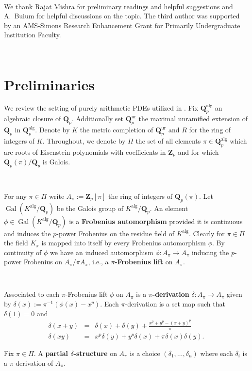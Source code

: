 \documentclass[10pt]{amsart}
\theoremstyle{Theorem}
\theoremstyle{definition}
\newcommand{\ZZ}{\mathbf Z}
\newcommand{\QQ}{\mathbf Q}
\renewcommand{\d}{\delta}
\def\ur{\textrm{ur}}
\def\alg{\textrm{alg}}
\def\Gal{\operatorname{Gal}}
\begin{document}
\

 We thank Rajat Mishra for preliminary readings and helpful suggestions and A.\ Buium for helpful discussions on the topic. The third author was supported by an AMS-Simons Research Enhancement Grant for Primarily Undergraduate Institution Faculty.


\
	
\section{Preliminaries} We review the setting of purely arithmetic PDEs utilized in \cite{BM23b,BM26}. Fix $\QQ_p^{\alg}$ an algebraic closure of $\QQ_p$. Additionally set $\QQ_p^{\ur}$ the maximal unramified extension of $\QQ_p$ in $\QQ_p^{\alg}$. Denote by $K$ the metric completion of $\QQ_p^{\ur}$ and $R$ for the ring of integers of $K$. Throughout, we denote by $\Pi$ the set of all elements $\pi \in \QQ_p^{\alg}$ which are roots of Eisenstein polynomials with coefficients in $\ZZ_p$ and for which $\QQ_p(\pi)/\QQ_p$ is Galois. 

\

For any $\pi\in \Pi$ write $A_\pi := \ZZ_p[\pi]$ the ring of integers of $\QQ_p(\pi)$. Let $\Gal(K^{\alg}/\QQ_p)$ be the Galois group of $K^{\alg}/\QQ_p$. An element $\phi \in \Gal(K^{\alg}/\QQ_p)$ is a {\bf Frobenius automorphism} provided it is continuous and induces the $p$-power Frobenius on the residue field of $K^{\alg}$. Clearly for $\pi\in \Pi$ the field $K_{\pi}$ is mapped into itself by every Frobenius automorphism $\phi$. By continuity of $\phi$ we have an induced automorphism $\phi \colon A_\pi \to A_\pi$ inducing the $p$-power Frobenius on $A_\pi/\pi A_\pi$, i.e., a {\bf $\pi$-Frobenius lift} on $A_\pi$. 

\

Associated to each $\pi$-Frobenius lift $\phi$ on $A_\pi$ is a {\bf $\pi$-derivation} $\delta \colon A_\pi \to A_\pi$ given by $\d(x) := \pi^{-1}(\phi(x) - x^p)$. Each $\pi$-derivation is a set map such that $\delta(1) = 0$ and  
\begin{eqnarray*}
 \delta(x+y) & = & \delta(x) + \delta(y) + \frac{ x^p + y^p - (x+y)^p}{\pi} \\
 \delta(xy) & = & x^p \delta (y) + y^p \delta (x) + \pi \delta (x) \delta (y).
\end{eqnarray*} 

\noindent Fix $\pi \in \Pi$. A {\bf partial $\delta$-structure} on $A_\pi$ is a choice $(\delta_1,\ldots,\delta_n)$ where each $\delta_i$ is a $\pi$-derivation of $A_\pi$. 
\end{document}
